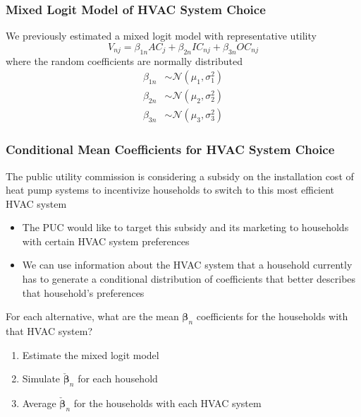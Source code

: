 \documentclass{beamer}
\begin{document}
\begin{frame}\frametitle{Mixed Logit Model of HVAC System Choice}
    We previously estimated a mixed logit model with representative utility
    $$V_{nj} = \beta_{1n} AC_j + \beta_{2n} IC_{nj} + \beta_{3n} OC_{nj}$$
    where the random coefficients are normally distributed
    \begin{align*}
        \beta_{1n} & \sim \mathcal{N}(\mu_1, \sigma_1^2) \\
        \beta_{2n} & \sim \mathcal{N}(\mu_2, \sigma_2^2) \\
        \beta_{3n} & \sim \mathcal{N}(\mu_3, \sigma_3^2)
    \end{align*}
\end{frame}

\begin{frame}\frametitle{Conditional Mean Coefficients for HVAC System Choice}
    The public utility commission is considering a subsidy on the installation cost of heat pump systems to incentivize households to switch to this most efficient HVAC system
    \begin{itemize}
        \item The PUC would like to target this subsidy and its marketing to households with certain HVAC system preferences
        \item We can use information about the HVAC system that a household currently has to generate a conditional distribution of coefficients that better describes that household's preferences
    \end{itemize}
    \vspace{2ex}
    For each alternative, what are the mean $\bm{\beta}_n$ coefficients for the households with that HVAC system?
    \begin{enumerate}
        \item Estimate the mixed logit model
        \item Simulate $\check{\bm{\beta}}_n$ for each household
        \item Average $\check{\bm{\beta}}_n$ for the households with each HVAC system
    \end{enumerate}
\end{frame}
\end{document}

